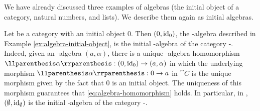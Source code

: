 We have already discussed three examples of algebras (the initial
object of a category, natural numbers, and lists). We describe them
again as initial algebras.

\begin{example}
  \label{ex:initial-algebra-initial-object}


  Let  be a category with an initial object $0$. Then
  $(0,\operatorname{id}_{0})$, the -algebra described in Example
  \ref{ex:algebra-initial-object}, is the initial -algebra of
  the category -\alg. Indeed, given an -algebra
  $(a,\alpha)$, there is a unique -algebra homomorphism
  $\cata{\alpha}: (0,\idO{0}) \to (a,\alpha)$ in which the underlying
  morphism $\cata{\alpha}: 0 \to a$ in $\cat{C}$ is the unique
  morphism given by the fact that $0$ is an initial object. The
  uniqueness of this morphism guarantees that
  \eqref{eq:algebra-homomorphism} holds. In particular, in \set,
  $(\emptyset,\operatorname{id}_{\emptyset})$ is the initial -algebra of the
  category -\alg.

\end{example}

